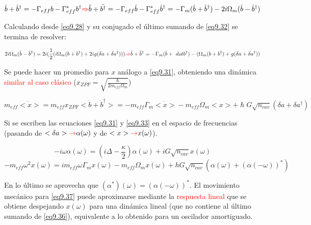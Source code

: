 \documentclass{book}
\begin{document}
 \begin{equation}\label{eq9.32}\dot{b}+\dot{b}^\dag=-\Gamma_{eff}b-\Gamma^*_{eff}b^\dag\textcolor{red}{\Rightarrow} \ddot{b}+\ddot{b^\dag}=-\Gamma_{eff}\dot{b}-\Gamma^*_{eff}\dot{b}^\dag=-\Gamma_m(\dot{b}+\dot{b}^\dag)-2i\Omega_m(\dot{b}-\dot{b}^\dag)\end{equation}
 
Calculando desde \ref{eq9.28} y su conjugado el último sumando de \ref{eq9.32} se termina de resolver:

\begin{equation}\label{eq9.33}2i\Omega_m(\dot{b}-\dot{b}^\dag)=2i(\frac{1}{2}(i\Omega_m(b+b^\dag)+2ig(\delta a+\delta a^\dag)))\textcolor{red}{\Rightarrow}\ddot{b}+\ddot{b}^\dag= -\Gamma_m(\dot{b}+\
dot{b}^\dag)-(\Omega_m(b+b^\dag)+g(\delta a+\delta a^\dag))\end{equation}

Se puede hacer un promedio para $x$ análogo a \ref{eq9.31}, obteniendo una dinámica \textcolor{red}{similar al caso clásico} ($x_{ZPF}=\sqrt{\frac{\hslash}{2m_{eff}\Omega_m}}$)

\begin{equation}\label{eq9.34} m_{eff}\ddot{<x>}=m_{eff}x_{ZPF}<\ddot{b}+\ddot{b}^\dag>=-m_{eff}\Gamma_m \dot{<x>}-m_{eff}\Omega_m<x>+\hslash G\sqrt{n_{cav}}(\delta a+\delta a^\dag )\end{equation}

Si se escriben las ecuaciones \ref{eq9.31} y \ref{eq9.33} en el espacio de frecuencias (pasando de $<\delta a>\textcolor{red}{\rightarrow} \alpha(\omega)$ y de $<x>\textcolor{red}{\rightarrow} x(\omega)$).

\begin{equation}\label{eq9.35}-i\omega\alpha(\omega)=(i\Delta-\frac{\kappa}{2})\alpha(\omega)+iG\sqrt{n_{cav}}x(\omega)\end{equation}
\begin{equation}\label{eq9.36}-m_{eff}\omega^2x(\omega)=im_{eff}\omega\Gamma_m x(\omega)-m_{eff}\Omega_m x(\omega)+hG\sqrt{n_{cav}}(\alpha(\omega)+(\alpha(-\omega))^*)\end{equation}

En lo último se aprovecha que $(\alpha^*)(\omega)=(\alpha(-\omega))^*$. El movimiento mecánico para \ref{eq9.37} puede aproximarse mediante la \textcolor{red}{respuesta lineal} que se obtiene despejando $x(\omega)$ para una dinámica lineal (que no contiene al último sumando de \ref{eq9.36}), equivalente a lo obtenido para un oscilador amortiguado.
\end{document}
